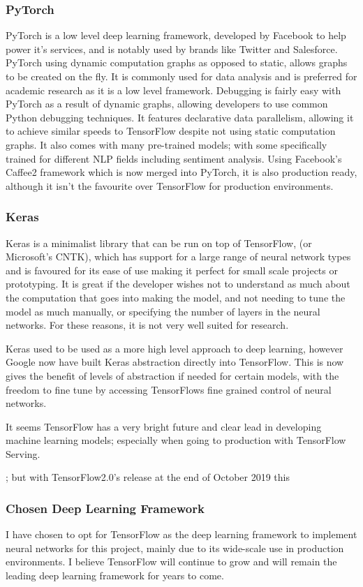 \documentclass[11pt]{article}
\begin{document}
\subsubsection{PyTorch}
PyTorch is a low level deep learning framework, developed by Facebook to help power it's services, and is notably used by brands like Twitter and Salesforce. PyTorch using dynamic computation graphs as opposed to static, allows graphs to be created on the fly. It is commonly used for data analysis and is preferred for academic research as it is a low level framework. Debugging is fairly easy with PyTorch as a result of dynamic graphs, allowing developers to use common Python debugging techniques. It features declarative data parallelism, allowing it to achieve similar speeds to TensorFlow despite not using static computation graphs. It also comes with many pre-trained models; with some specifically trained for different NLP fields including sentiment analysis. Using Facebook's Caffee2 framework which is now merged into PyTorch, it is also production ready, although it isn't the favourite over TensorFlow for production environments.   

\subsubsection{Keras}
Keras is a minimalist library that can be run on top of TensorFlow, (or Microsoft's CNTK), which has support for a large range of neural network types and is favoured for its ease of use making it perfect for small scale projects or prototyping. It is great if the developer wishes not to understand as much about the computation that goes into making the model, and not needing to tune the model as much manually, or specifying the number of layers in the neural networks. For these reasons, it is not very well suited for research. 

Keras used to be used as a more high level approach to deep learning, however Google now have built Keras abstraction directly into TensorFlow.
This is now gives the benefit of levels of abstraction if needed for certain models, with the freedom to fine tune by accessing TensorFlows fine grained control of neural networks. 

It seems TensorFlow has a very bright future and clear lead in developing machine learning models; especially when going to production with TensorFlow Serving.

; but with TensorFlow2.0's release at the end of October 2019 this
\subsubsection{Chosen Deep Learning Framework}
I have chosen to opt for TensorFlow as the deep learning framework to implement neural networks for this project, mainly due to its wide-scale use in production environments. I believe TensorFlow will continue to grow and will remain the leading deep learning framework for years to come. 
\end{document}
